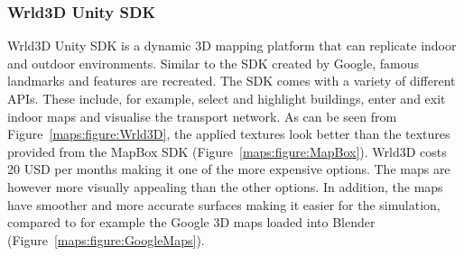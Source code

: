 \subsubsection{Wrld3D Unity SDK} 
Wrld3D Unity SDK is a dynamic 3D mapping platform that can replicate indoor and outdoor environments. Similar to the SDK created by Google, famous landmarks and features are recreated. The SDK comes with a variety of different APIs. These include,  for example, select and highlight buildings, enter and exit indoor maps and visualise the transport network. As can be seen from Figure~\ref{maps:figure:Wrld3D}, the applied textures look better than the textures provided from the MapBox SDK (Figure~\ref{maps:figure:MapBox}). Wrld3D costs 20 USD per months making it one of the more expensive options. The maps are however more visually appealing than the other options. In addition, the maps have smoother and more accurate surfaces making it easier for the simulation, compared to for example the Google 3D maps loaded into Blender (Figure~\ref{maps:figure:GoogleMaps}).

